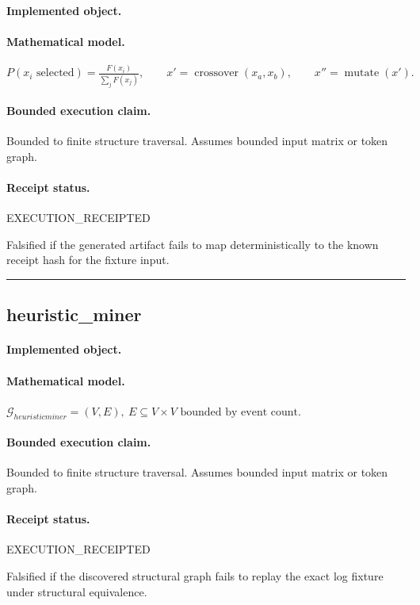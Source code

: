 \paragraph{Implemented object.} 
\paragraph{Mathematical model.} $P(x_i\text{ selected}) = \frac{F(x_i)}{\sum_j F(x_j)}, \qquad x'=\operatorname{crossover}(x_a,x_b), \qquad x''=\operatorname{mutate}(x').$
\paragraph{Bounded execution claim.} Bounded to finite structure traversal. Assumes bounded input matrix or token graph.
\paragraph{Receipt status.} EXECUTION\_RECEIPTED
\begin{falsifier}
Falsified if the generated artifact fails to map deterministically to the known receipt hash for the fixture input.
\end{falsifier}

\vspace{1em}\hrule\vspace{1em}
\subsection{heuristic\_miner}
\paragraph{Implemented object.} 
\paragraph{Mathematical model.} $\mathcal{G}_{heuristicminer} = (V, E), \ E \subseteq V \times V \text{ bounded by event count}.$
\paragraph{Bounded execution claim.} Bounded to finite structure traversal. Assumes bounded input matrix or token graph.
\paragraph{Receipt status.} EXECUTION\_RECEIPTED
\begin{falsifier}
Falsified if the discovered structural graph fails to replay the exact log fixture under structural equivalence.
\end{falsifier}

